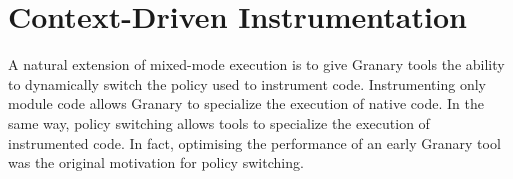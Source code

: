 \documentclass[preprint]{sigplanconf}
\begin{document}

%
%





\section{Context-Driven Instrumentation}\label{sec:policies}

A natural extension of mixed-mode execution is to give Granary tools the ability to dynamically switch the policy used to instrument code. Instrumenting only module code allows Granary to specialize the execution of native code. In the same way, policy switching allows tools to specialize the execution of instrumented code. In fact, optimising the performance of an early Granary tool was the original motivation for policy switching.
\end{document}
